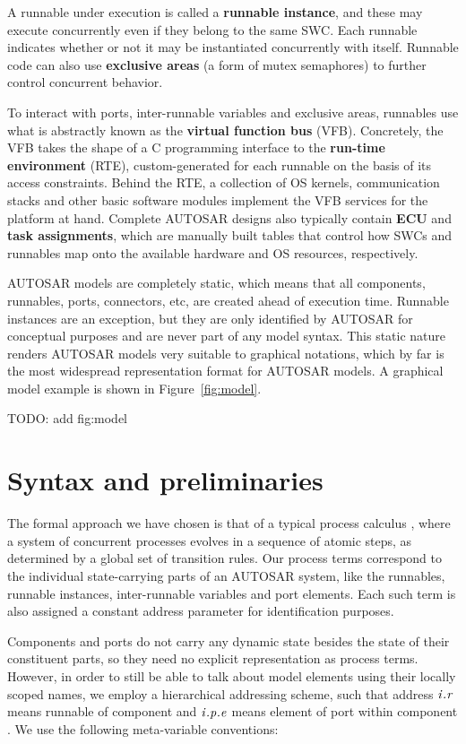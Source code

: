 \documentclass[twocolumn]{article}
\begin{document}
A runnable under execution is called a \textbf{runnable instance}, and these may execute concurrently even if they belong to the same SWC. Each runnable indicates whether or not it may be instantiated concurrently with itself. Runnable code can also use \textbf{exclusive areas} (a form of mutex semaphores) to further control concurrent behavior.

To interact with ports, inter-runnable variables and exclusive areas, runnables use what is abstractly known as the \textbf{virtual function bus} (VFB). Concretely, the VFB takes the shape of a C programming interface to the \textbf{run-time environment} (RTE), custom-generated for each runnable on the basis of its access constraints. Behind the RTE, a collection of OS kernels, communication stacks and other basic software modules implement the VFB services for the platform at hand. Complete AUTOSAR designs also typically contain \textbf{ECU} and \textbf{task assignments}, which are manually built tables that control how SWCs and runnables map onto the available hardware and OS resources, respectively.

AUTOSAR models are completely static, which means that all components, runnables, ports, connectors, etc, are created ahead of execution time. Runnable instances are an exception, but they are only identified by AUTOSAR for conceptual purposes and are never part of any model syntax. This static nature renders AUTOSAR models very suitable to graphical notations, which by far is the most widespread representation format for AUTOSAR models. A graphical model example is shown in Figure~\ref{fig:model}.

TODO: add fig:model

\section{Syntax and preliminaries}
\label{sec:Calc}

The formal approach we have chosen is that of a typical process calculus \cite{TODO}, where a system of concurrent processes evolves in a sequence of atomic steps, as determined by a global set of transition rules. Our process terms correspond to the individual state-carrying parts of an AUTOSAR system, like the runnables, runnable instances, inter-runnable variables and port elements. Each such term is also assigned a constant address parameter for identification purposes.

Components and ports do not carry any dynamic state besides the state of their constituent parts, so they need no explicit representation as process terms. However, in order to still be able to talk about model elements using their locally scoped names, we employ a hierarchical addressing scheme, such that address $\Tr{\V{R}}{\V{I}}$ means runnable  of component  and $\Tep{\V{E}}{\V{P}}{\V{I}}$ means element  of port  within component . We use the following meta-variable conventions:
\end{document}
